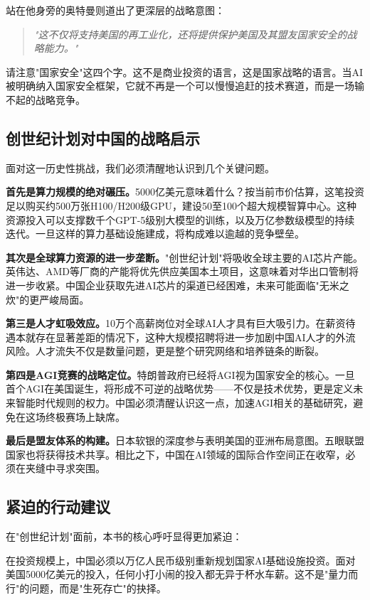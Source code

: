 站在他身旁的奥特曼则道出了更深层的战略意图：
\begin{quote}
\textit{"这不仅将支持美国的再工业化，还将提供保护美国及其盟友国家安全的战略能力。"}
\end{quote}

请注意"国家安全"这四个字。这不是商业投资的语言，这是国家战略的语言。当AI被明确纳入国家安全框架，它就不再是一个可以慢慢追赶的技术赛道，而是一场输不起的战略竞争。

\subsection{创世纪计划对中国的战略启示}

面对这一历史性挑战，我们必须清醒地认识到几个关键问题。

\textbf{首先是算力规模的绝对碾压。}5000亿美元意味着什么？按当前市价估算，这笔投资足以购买约500万张H100/H200级GPU，建设50至100个超大规模智算中心。这种资源投入可以支撑数千个GPT-5级别大模型的训练，以及万亿参数级模型的持续迭代。一旦这样的算力基础设施建成，将构成难以逾越的竞争壁垒。

\textbf{其次是全球算力资源的进一步垄断。}"创世纪计划"将吸收全球主要的AI芯片产能。英伟达、AMD等厂商的产能将优先供应美国本土项目，这意味着对华出口管制将进一步收紧。中国企业获取先进AI芯片的渠道已经困难，未来可能面临"无米之炊"的更严峻局面。

\textbf{第三是人才虹吸效应。}10万个高薪岗位对全球AI人才具有巨大吸引力。在薪资待遇本就存在显著差距的情况下，这种大规模招聘将进一步加剧中国AI人才的外流风险。人才流失不仅是数量问题，更是整个研究网络和培养链条的断裂。

\textbf{第四是AGI竞赛的战略定位。}特朗普政府已经将AGI视为国家安全的核心。一旦首个AGI在美国诞生，将形成不可逆的战略优势——不仅是技术优势，更是定义未来智能时代规则的权力。中国必须清醒认识这一点，加速AGI相关的基础研究，避免在这场终极赛场上缺席。

\textbf{最后是盟友体系的构建。}日本软银的深度参与表明美国的亚洲布局意图。五眼联盟国家也将获得技术共享。相比之下，中国在AI领域的国际合作空间正在收窄，必须在夹缝中寻求突围。

\subsection{紧迫的行动建议}

在"创世纪计划"面前，本书的核心呼吁显得更加紧迫：

在投资规模上，中国必须以万亿人民币级别重新规划国家AI基础设施投资。面对美国5000亿美元的投入，任何小打小闹的投入都无异于杯水车薪。这不是"量力而行"的问题，而是"生死存亡"的抉择。

